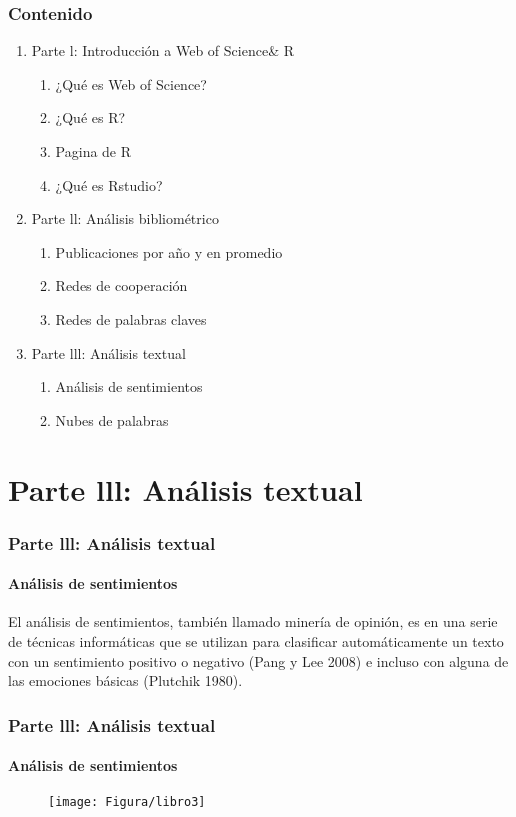 \documentclass[11pt]{beamer}
\begin{document}
\begin{frame}
\frametitle{Contenido}
\begin{enumerate}[<i->]
\item Parte l: Introducción a Web of Science\& R
\begin{enumerate} [a]
\item ¿Qué es Web of Science?
\item ¿Qué es R? 
\item Pagina de R
\item  ¿Qué es Rstudio?
\end{enumerate}
\item Parte ll: Análisis bibliométrico
\begin{enumerate} [a]
\item Publicaciones por año y en promedio
\item Redes de cooperación
\item Redes de palabras claves
\end{enumerate}
\item<1-> Parte lll: Análisis textual
\begin{enumerate} [a]
\item<1-> Análisis de sentimientos
\item<1-> Nubes de palabras 
\end{enumerate}
\end{enumerate}
\end{frame}


\section{Parte lll: Análisis textual}
\begin{frame}
\frametitle{Parte lll: Análisis textual}
\framesubtitle{Análisis de sentimientos}
El análisis de sentimientos, también llamado minería de opinión, es en una serie de técnicas informáticas que se utilizan para clasificar automáticamente un texto con un sentimiento positivo o negativo (Pang y Lee 2008) e incluso con alguna de las emociones básicas (Plutchik 1980).
\end{frame}



\begin{frame}
\frametitle{Parte lll: Análisis textual}
\framesubtitle{Análisis de sentimientos}
\begin{figure}
{\texttt{[image: Figura/libro3]}} 	\\
	\end{figure}
\end{frame}
\end{document}
